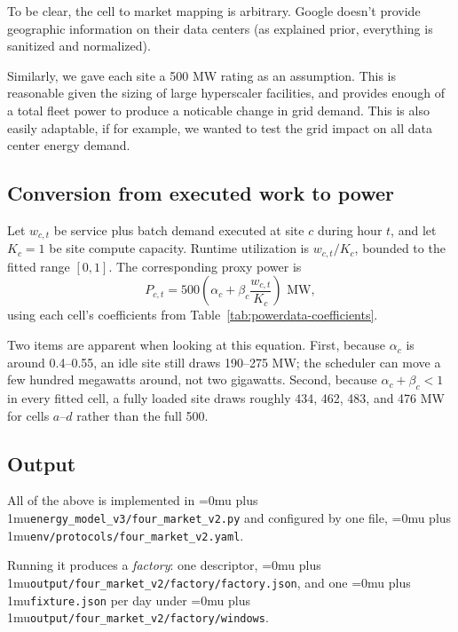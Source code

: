 \documentclass[12pt]{article}
\newcommand{\codepath}[1]{{\Urlmuskip=0mu plus 1mu\relax\nolinkurl{#1}}}
\begin{document}
To be clear, the cell to market mapping is arbitrary. Google doesn't provide geographic information on their data centers (as explained prior, everything is sanitized and normalized). 

Similarly, we gave each site a 500 MW rating as an assumption. This is reasonable given the sizing of large hyperscaler facilities, and provides enough of a total fleet power to produce a noticable change in grid demand. This is also easily adaptable, if for example, we wanted to test the grid impact on all data center energy demand.

\subsection{Conversion from executed work to power}
\label{subsec:transform-runtime-power}

Let \(w_{c,t}\) be service plus batch demand executed at site \(c\) during hour
\(t\), and let \(K_c=1\) be site compute capacity. Runtime utilization is
\(w_{c,t}/K_c\), bounded to the fitted range \([0,1]\). The corresponding proxy
power is
\begin{equation}
  P_{c,t}
  =
  500
  \left(
    \alpha_c + \beta_c \frac{w_{c,t}}{K_c}
  \right)
  \text{ MW},
  \label{eq:transform-runtime-power}
\end{equation}
using each cell's coefficients from Table~\ref{tab:powerdata-coefficients}. 

Two items are apparent when looking at this equation. First, because \(\alpha_c\) is around 0.4--0.55, an idle site still draws 190--275 MW; the scheduler can move a few hundred megawatts around, not two gigawatts. Second, because \(\alpha_c+\beta_c<1\) in every fitted cell, a fully loaded site draws roughly 434, 462, 483, and 476 MW for cells \(a\)--\(d\) rather than the full 500.

\subsection{Output}
\label{subsec:Output-factory}

All of the above is implemented in \codepath{energy_model_v3/four_market_v2.py} and configured by one file, \codepath{env/protocols/four_market_v2.yaml}. 

Running it produces a \emph{factory}: one descriptor, \codepath{output/four_market_v2/factory/factory.json}, and one \codepath{fixture.json} per day under \codepath{output/four_market_v2/factory/windows}. 
\end{document}
